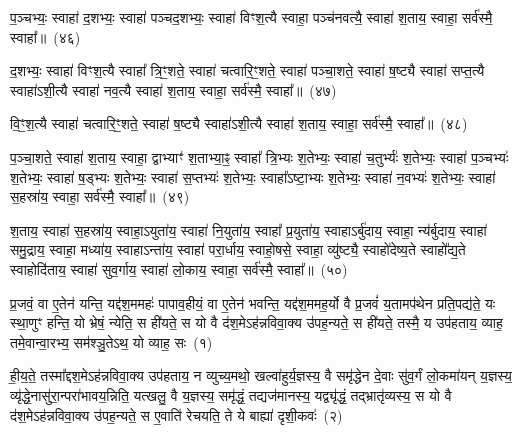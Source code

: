 {\anuvakamend[{च॒तुर्भ्यः॒ षण्ण॑वत्यै॒ षोड॑श}]}%

प॒ञ्चभ्यः॒ स्वाहा॑ द॒शभ्यः॒ स्वाहा॑ पञ्चद॒शभ्यः॒ स्वाहा॑ विꣳश॒त्यै स्वाहा॒ पञ्च॑नवत्यै॒ स्वाहा॑ श॒ताय॒ स्वाहा॒ सर्व॑स्मै॒ स्वाहा᳚॥~(४६)

{\anuvakamend[{प॒ञ्चभ्यः॒ प़ञ्च॑नवत्यै॒ चतु॑र्दश}]}%

द॒शभ्यः॒ स्वाहा॑ विꣳश॒त्यै स्वाहा᳚ त्रि॒ꣳ॒शते॒ स्वाहा॑ चत्वारि॒ꣳ॒शते॒ स्वाहा॑ पञ्चा॒शते॒ स्वाहा॑ ष॒ष्ट्यै स्वाहा॑ सप्त॒त्यै स्वाहा॑\-ऽशी॒त्यै स्वाहा॑ नव॒त्यै स्वाहा॑ श॒ताय॒ स्वाहा॒ सर्व॑स्मै॒ स्वाहा᳚॥~(४७)

{\anuvakamend[{द॒शभ्यो॒ द्वाविꣳ॑शतिः}]}%

वि॒ꣳ॒श॒त्यै स्वाहा॑ चत्वारि॒ꣳ॒शते॒ स्वाहा॑ ष॒ष्ट्यै स्वाहा॑\-ऽशी॒त्यै स्वाहा॑ श॒ताय॒ स्वाहा॒ सर्व॑स्मै॒ स्वाहा᳚॥~(४८)

{\anuvakamend[{वि॒ꣳ॒श॒त्यै द्वाद॑श}]}%

प॒ञ्चा॒शते॒ स्वाहा॑ श॒ताय॒ स्वाहा॒ द्वाभ्याꣳ॑ श॒ताभ्या॒ꣴ॒ स्वाहा᳚ त्रि॒भ्यः श॒तेभ्यः॒ स्वाहा॑ च॒तुर्भ्यः॑ श॒तेभ्यः॒ स्वाहा॑ प॒ञ्चभ्यः॑ श॒तेभ्यः॒ स्वाहा॑ ष॒ड्भ्यः श॒तेभ्यः॒ स्वाहा॑ स॒प्तभ्यः॑ श॒तेभ्यः॒ स्वाहा᳚\-ऽष्टा॒भ्यः श॒तेभ्यः॒ स्वाहा॑ न॒वभ्यः॑ श॒तेभ्यः॒ स्वाहा॑ स॒हस्रा॑य॒ स्वाहा॒ सर्व॑स्मै॒ स्वाहा᳚॥~(४९)

{\anuvakamend[{प॒ञ्चा॒शते॒ द्वात्रिꣳ॑शत्}]}%

श॒ताय॒ स्वाहा॑ स॒हस्रा॑य॒ स्वाहा॒\-ऽयुता॑य॒ स्वाहा॑ नि॒युता॑य॒ स्वाहा᳚ प्र॒युता॑य॒ स्वाहा\-ऽर्बु॑दाय॒ स्वाहा॒ न्य॑र्बुदाय॒ स्वाहा॑ समु॒द्राय॒ स्वाहा॒ मध्या॑य॒ स्वाहा\-ऽन्ता॑य॒ स्वाहा॑ परा॒र्धाय॒ स्वाहो॒षसे॒ स्वाहा॒ व्यु॑ष्ट्यै॒ स्वाहो॑देष्य॒ते स्वाहो᳚द्य॒ते स्वाहोदि॑ताय॒ स्वाहा॑ सुव॒र्गाय॒ स्वाहा॑ लो॒काय॒ स्वाहा॒ सर्व॑स्मै॒ स्वाहा᳚॥~(५०)

{\anuvakamend[{श॒ताया॒ष्टात्रिꣳ॑शत्}]}%


{\prashnaend[{}]}

\setcounter{anuvakam}{0}
प्र॒जवं॒ वा ए॒तेन॑ यन्ति॒ यद्द॑श॒ममहः॑ पापाव॒हीयं॒ वा ए॒तेन॑ भवन्ति॒ यद्द॑श॒ममह॒र्यो वै प्र॒जवं॑ य॒तामप॑थेन प्रति॒पद्य॑ते॒ यः स्था॒णुꣳ हन्ति॒ यो भ्रेषं॒ न्येति॒ स ही॑यते॒ स यो वै द॑श॒मे\-ऽह॑न्नविवा॒क्य उ॑पह॒न्यते॒ स ही॑यते॒ तस्मै॒ य उप॑हताय॒ व्याह॒ तमे॒वान्वा॒रभ्य॒ सम॑श्ञु॒ते\-ऽथ॒ यो व्याह॒ सः~(१)

ही॒य॒ते॒ तस्मा᳚द्दश॒मे\-ऽह॑न्नविवा॒क्य उप॑हताय॒ न व्युच्य॒मथो॒ खल्वा॑हुर्य॒ज्ञस्य॒ वै समृ॑द्धेन दे॒वाः सु॑व॒र्गं लो॒कमा॑यन् य॒ज्ञस्य॒ व्यृ॑द्धे॒नासु॑रा॒न्परा॑भावय॒न्निति॒ यत्खलु॒ वै य॒ज्ञस्य॒ समृ॑द्धं॒ तद्यज॑मानस्य॒ यद्व्यृ॑द्धं॒ तद्भ्रातृ॑व्यस्य॒ स यो वै द॑श॒मे\-ऽह॑न्नविवा॒क्य उ॑पह॒न्यते॒ स ए॒वाति॑ रेचयति॒ ते ये बाह्या॑ दृशी॒कवः॑~(२)

